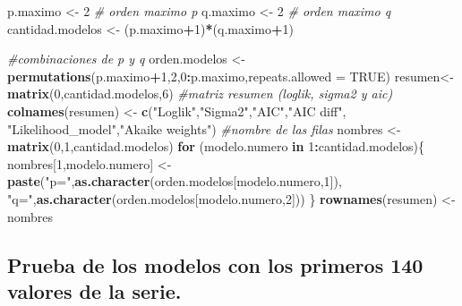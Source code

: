 \documentclass[
  11pt,
]{article}
\newenvironment{Shaded}{\begin{snugshade}}{\end{snugshade}}
\newcommand{\CommentTok}[1]{\textcolor[rgb]{0.56,0.35,0.01}{\textit{#1}}}
\newcommand{\ControlFlowTok}[1]{\textcolor[rgb]{0.13,0.29,0.53}{\textbf{#1}}}
\newcommand{\DataTypeTok}[1]{\textcolor[rgb]{0.13,0.29,0.53}{#1}}
\newcommand{\DecValTok}[1]{\textcolor[rgb]{0.00,0.00,0.81}{#1}}
\newcommand{\KeywordTok}[1]{\textcolor[rgb]{0.13,0.29,0.53}{\textbf{#1}}}
\newcommand{\NormalTok}[1]{#1}
\newcommand{\OperatorTok}[1]{\textcolor[rgb]{0.81,0.36,0.00}{\textbf{#1}}}
\newcommand{\OtherTok}[1]{\textcolor[rgb]{0.56,0.35,0.01}{#1}}
\newcommand{\StringTok}[1]{\textcolor[rgb]{0.31,0.60,0.02}{#1}}
\begin{document}
\begin{Shaded}
\begin{Highlighting}[]
\NormalTok{p.maximo <-}\StringTok{ }\DecValTok{2}  \CommentTok{# orden maximo p }
\NormalTok{q.maximo <-}\StringTok{ }\DecValTok{2}  \CommentTok{# orden maximo q }
\NormalTok{cantidad.modelos <-}\StringTok{ }\NormalTok{(p.maximo}\OperatorTok{+}\DecValTok{1}\NormalTok{)}\OperatorTok{*}\NormalTok{(q.maximo}\OperatorTok{+}\DecValTok{1}\NormalTok{)  }

\CommentTok{#combinaciones de p y q}
\NormalTok{orden.modelos <-}\StringTok{ }\KeywordTok{permutations}\NormalTok{(p.maximo}\OperatorTok{+}\DecValTok{1}\NormalTok{,}\DecValTok{2}\NormalTok{,}\DecValTok{0}\OperatorTok{:}\NormalTok{p.maximo,}\DataTypeTok{repeats.allowed =} \OtherTok{TRUE}\NormalTok{) }
\NormalTok{resumen<-}\StringTok{ }\KeywordTok{matrix}\NormalTok{(}\DecValTok{0}\NormalTok{,cantidad.modelos,}\DecValTok{6}\NormalTok{)  }\CommentTok{#matriz resumen (loglik, sigma2 y aic)}
\KeywordTok{colnames}\NormalTok{(resumen) <-}\StringTok{ }\KeywordTok{c}\NormalTok{(}\StringTok{"Loglik"}\NormalTok{,}\StringTok{"Sigma2"}\NormalTok{,}\StringTok{"AIC"}\NormalTok{,}\StringTok{"AIC diff"}\NormalTok{,}
                       \StringTok{"Likelihood_model"}\NormalTok{,}\StringTok{"Akaike weights"}\NormalTok{)}
 \CommentTok{#nombre de las filas}
\NormalTok{nombres <-}\StringTok{ }\KeywordTok{matrix}\NormalTok{(}\DecValTok{0}\NormalTok{,}\DecValTok{1}\NormalTok{,cantidad.modelos)}
\ControlFlowTok{for}\NormalTok{ (modelo.numero }\ControlFlowTok{in} \DecValTok{1}\OperatorTok{:}\NormalTok{cantidad.modelos)\{}
\NormalTok{  nombres[}\DecValTok{1}\NormalTok{,modelo.numero] <-}\StringTok{ }\KeywordTok{paste}\NormalTok{(}\StringTok{"p="}\NormalTok{,}\KeywordTok{as.character}\NormalTok{(orden.modelos[modelo.numero,}\DecValTok{1}\NormalTok{]),}
                                    \StringTok{"q="}\NormalTok{,}\KeywordTok{as.character}\NormalTok{(orden.modelos[modelo.numero,}\DecValTok{2}\NormalTok{]))}
\NormalTok{\}}
\KeywordTok{rownames}\NormalTok{(resumen) <-}\StringTok{ }\NormalTok{nombres}
\end{Highlighting}
\end{Shaded}

\hypertarget{prueba-de-los-modelos-con-los-primeros-140-valores-de-la-serie.}{%
\subsection{Prueba de los modelos con los primeros 140 valores de la
serie.}\label{prueba-de-los-modelos-con-los-primeros-140-valores-de-la-serie.}}
\end{document}
